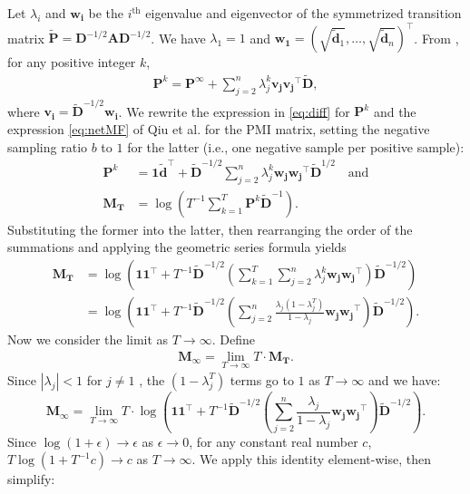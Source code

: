 \documentclass[sigconf]{acmart}
\newcommand{\mbf}[1]{\mathbf{#1}}
\newcommand{\bv}[1]{\mathbf{#1}}
\begin{document}
Let $\lambda_i$ and $\mbf{w_i}$ be the $i^\text{th}$ eigenvalue and eigenvector of the symmetrized transition matrix $\mbf{\tilde{P}} = \bv{D}^{-1/2}\bv{A} \bv{D}^{-1/2}$. We have $\lambda_1=1$ and $\mbf{w_1}=\left( \sqrt{\bm{\tilde{d}}_1}, \dots, \sqrt{\bm{\tilde{d}}_n} \right)^\top$. From \cite{levinsoneigenvalue}, for any positive integer $k$,
%
\begin{align}\label{eq:diff} \mbf{P}^k = \mbf{P}^\infty + \sum_{j=2}^n \lambda_j^k \mbf{v_j} \mbf{v_j}^\top \mbf{\tilde{D}}, 
\end{align}
%
where $\mbf{v_i} = \mbf{\tilde{D}}^{-1/2} \mbf{w_i}$. We rewrite the expression in  \eqref{eq:diff} for $\mbf{P}^k$ and the expression \eqref{eq:netMF} of Qiu et al. for the PMI matrix, setting the negative sampling ratio $b$ to $1$ for the latter (i.e., one negative sample per positive sample):
%
\begin{align*}
\mbf{P}^k &= \mbf{1} \bm{\tilde{d}}^\top + \mbf{\tilde{D}}^{-1/2} \sum_{j=2}^n \lambda_j^k \mbf{w_j} \mbf{w_j}^\top \mbf{\tilde{D}}^{1/2} \quad \text{and} \\
\mbf{M_T} &= \log\left( T^{-1} \sum_{k=1}^T \mbf{P}^k \mbf{\tilde{D}}^{-1} \right) .
\end{align*}
%
Substituting the former into the latter, then rearranging the order of the summations and applying the geometric series formula yields
%
\begin{align*}
    \mbf{M_T} 
    &= \log\left( \mbf{1}\mbf{1}^\top + T^{-1} \mbf{\tilde{D}}^{-1/2} \left( \sum_{k=1}^T\sum_{j=2}^n \lambda_j^k \mbf{w_j} \mbf{w_j}^\top \right) \mbf{\tilde{D}}^{-1/2} \right) \\
    &= \log\left( \mbf{1}\mbf{1}^\top + T^{-1} \mbf{\tilde{D}}^{-1/2} \left( \sum_{j=2}^n \frac{\lambda_j (1 - \lambda_j^T)}{1 - \lambda_j} \mbf{w_j} \mbf{w_j}^\top \right) \mbf{\tilde{D}}^{-1/2}  \right) .
\end{align*}
%
Now we consider the limit as $T\to \infty$. Define
\begin{align*}
   \bv{M_\infty} = \lim_{T\to\infty}T \cdot \mbf{M_T}.
\end{align*}
Since $|\lambda_j| < 1$ for $j\neq 1$ \cite{levinsoneigenvalue}, the $(1 - \lambda_j^T)$ terms go to $1$ as $T \rightarrow \infty$ and we have:
%
\[ \bv{M_\infty} = \lim_{T\to\infty}T \cdot \log\left( \mbf{1}\mbf{1}^\top + T^{-1} \mbf{\tilde{D}}^{-1/2} \left( \sum_{j=2}^n \frac{\lambda_j}{1 - \lambda_j} \mbf{w_j} \mbf{w_j}^\top \right) \mbf{\tilde{D}}^{-1/2}  \right) .\] 
%
Since $\log(1+\epsilon) \to \epsilon$ as $\epsilon \to 0$, for any constant real number $c$, $T \log(1 + T^{-1}c) \to c$ as $T \to \infty$. We apply this identity element-wise, then simplify:
\end{document}
